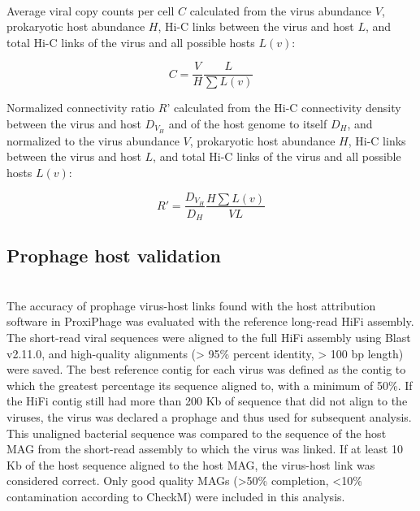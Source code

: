 \hfill\\
\begin{mycapequ}[!ht]
  \caption{Average viral copy counts per cell \(C\) calculated from the virus abundance \(V\), prokaryotic host abundance \(H\), Hi-C links between the virus and host \(L\), and total Hi-C links of the virus and all possible hosts \(L(v)\):}
  \begin{equation}
    C = \frac{V}{H}\frac{L}{\sum L(v)}
  \end{equation}
\end{mycapequ}

\begin{mycapequ}[!ht]
  \caption{Normalized connectivity ratio \(R’\) calculated from the Hi-C connectivity density between the virus and host \(D_V_H\) and of the host genome to itself \(D_H\), and normalized to the virus abundance \(V\), prokaryotic host abundance \(H\), Hi-C links between the virus and host \(L\), and total Hi-C links of the virus and all possible hosts \(L(v)\):}
  \begin{equation}
    R' = \frac{D_V_H}{D_H} \frac{H \sum L(v)}{V L}
  \end{equation}
\end{mycapequ}


\subsection*{Prophage host validation} \hfill\\
	The accuracy of prophage virus-host links found with the host attribution software in ProxiPhage was evaluated with the reference long-read HiFi assembly. The short-read viral sequences were aligned to the full HiFi assembly using Blast \cite{RN2885} v2.11.0, and high-quality alignments (> 95\% percent identity, > 100 bp length) were saved. The best reference contig for each virus was defined as the contig to which the greatest percentage its sequence aligned to, with a minimum of 50\%. If the HiFi contig still had more than 200 Kb of sequence that did not align to the viruses, the virus was declared a prophage and thus used for subsequent analysis. This unaligned bacterial sequence was compared to the sequence of the host MAG from the short-read assembly to which the virus was linked. If at least 10 Kb of the host sequence aligned to the host MAG, the virus-host link was considered correct. Only good quality MAGs (>50\% completion, <10\% contamination according to CheckM) were included in this analysis.
	
